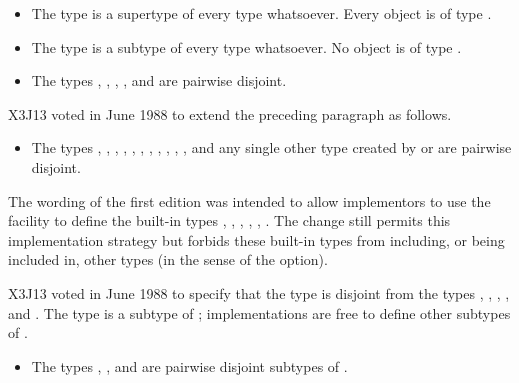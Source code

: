\begin{itemize}
\item
The type  is a supertype of every type whatsoever.
Every object is of type .

\item
The type {\nil} is a subtype of every type whatsoever.
No object is of type {\nil}.
\end{itemize}

\begin{obsolete}
\begin{itemize}
\item
The types , , , , and 
are pairwise disjoint.
\end{itemize}
\end{obsolete}

\begin{new}
X3J13 voted in June 1988
to extend the preceding paragraph as follows.

\begin{itemize}
\item
The types , , , , ,
, , , ,
, , and any single other type created by
 or 
are pairwise disjoint.
\end{itemize}

The wording of the first edition was intended to allow implementors to use
the  facility to define the built-in types ,
, , , , .
The change still permits this implementation strategy but
forbids these built-in types from including, or being included in,
other types (in the sense of the   option).
\end{new}

\begin{new}
X3J13 voted in June 1988 
to specify that the type 
is disjoint from the types , , , , and .
The type  is a subtype of ;
implementations are free to define other subtypes of .
\end{new}

\begin{obsolete}
\begin{itemize}
\item
The types , , and  are pairwise disjoint
subtypes of .
\end{itemize}
\end{obsolete}

